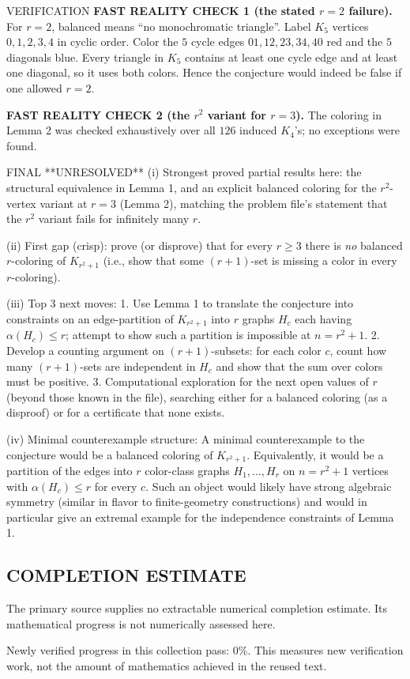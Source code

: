 VERIFICATION
\textbf{FAST REALITY CHECK 1 (the stated $r=2$ failure).}
For $r=2$, balanced means ``no monochromatic triangle''.
Label $K_5$ vertices $0,1,2,3,4$ in cyclic order.
Color the $5$ cycle edges
$01,12,23,34,40$ red and the $5$ diagonals blue.
Every triangle in $K_5$ contains at least one cycle edge and at least one diagonal,
so it uses both colors. Hence the conjecture would indeed be false if one
allowed $r=2$.

\textbf{FAST REALITY CHECK 2 (the $r^2$ variant for $r=3$).}
The coloring in Lemma 2 was checked exhaustively over all $126$ induced $K_4$'s;
no exceptions were found.

FINAL
**UNRESOLVED**
(i) Strongest proved partial results here: the structural equivalence in Lemma 1,
and an explicit balanced coloring for the $r^2$-vertex variant at $r=3$ (Lemma 2),
matching the problem file's statement that the $r^2$ variant fails for infinitely
many $r$.

(ii) First gap (crisp): prove (or disprove) that for every $r\ge3$ there is \emph{no}
balanced $r$-coloring of $K_{r^2+1}$ (i.e., show that some $(r+1)$-set is missing a
color in every $r$-coloring).

(iii) Top 3 next moves:
1. Use Lemma 1 to translate the conjecture into constraints on an edge-partition
of $K_{r^2+1}$ into $r$ graphs $H_c$ each having $\alpha(H_c)\le r$; attempt to show
such a partition is impossible at $n=r^2+1$.
2. Develop a counting argument on $(r+1)$-subsets:
for each color $c$, count how many $(r+1)$-sets are independent in $H_c$ and show
that the sum over colors must be positive.
3. Computational exploration for the next open values of $r$ (beyond those known
in the file), searching either for a balanced coloring (as a disproof) or for a
certificate that none exists.

(iv) Minimal counterexample structure:
A minimal counterexample to the conjecture would be a balanced coloring of
$K_{r^2+1}$.
Equivalently, it would be a partition of the edges into $r$ color-class graphs
$H_1,\dots,H_r$ on $n=r^2+1$ vertices with $\alpha(H_c)\le r$ for every $c$.
Such an object would likely have strong algebraic symmetry (similar in flavor to
finite-geometry constructions) and would in particular give an extremal example
for the independence constraints of Lemma 1.




\subsection*{COMPLETION ESTIMATE}
The primary source supplies no extractable numerical completion estimate. Its mathematical progress is not numerically assessed here.

Newly verified progress in this collection pass: $0\%$. This measures new verification work, not the amount of mathematics achieved in the reused text.
